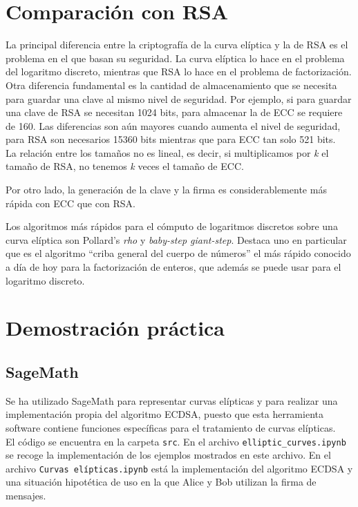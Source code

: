 \documentclass[11pt]{article}
\begin{document}
\section{Comparación con RSA}
\label{sec:RSA}
La principal diferencia entre la criptografía de la curva elíptica y la de RSA es el problema en el que basan su seguridad. La curva elíptica lo hace en el problema del logaritmo discreto, mientras que RSA lo hace en el problema de factorización. Otra diferencia fundamental es la cantidad de almacenamiento que se necesita para guardar una clave al mismo nivel de seguridad. Por ejemplo, si para guardar una clave de RSA se necesitan 1024 bits, para almacenar la de ECC se requiere de 160. Las diferencias son aún mayores cuando aumenta el nivel de seguridad, para RSA son necesarios 15360 bits mientras que para ECC tan solo 521 bits.\\ %

La relación entre los tamaños no es lineal, es decir, si multiplicamos por \textit{k} el tamaño de RSA, no tenemos \textit{k} veces el tamaño de ECC.

Por otro lado, la generación de la clave y la firma es considerablemente más rápida con ECC que con RSA.

Los algoritmos más rápidos para el cómputo de logaritmos discretos sobre una curva elíptica son Pollard's \textit{rho} y \textit{baby-step giant-step}. Destaca uno en particular que es el algoritmo ``criba general del cuerpo de números'' el más rápido conocido a día de hoy para la factorización de enteros, que además se puede usar para el logaritmo discreto.

\section{Demostración práctica}
\label{sec:demo}
\subsection{SageMath}
Se ha utilizado SageMath para representar curvas elípticas y para realizar una implementación propia del algoritmo ECDSA, puesto que esta herramienta software contiene funciones específicas para el tratamiento de curvas elípticas.\\
El código se encuentra en la carpeta \texttt{src}. En el archivo \texttt{elliptic\_curves.ipynb} se recoge la implementación de los ejemplos mostrados en este archivo. En el archivo \texttt{Curvas elípticas.ipynb} está la implementación del algoritmo ECDSA y una situación hipotética de uso en la que Alice y Bob utilizan la firma de mensajes.
\end{document}
